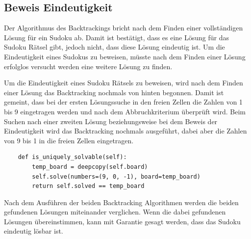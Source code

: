 \subsection{Beweis Eindeutigkeit}
Der Algorithmus des Backtrackings bricht nach dem Finden einer vollständigen Lösung für ein Sudoku ab. Damit ist bestätigt, dass es eine Lösung für das Sudoku Rätsel gibt, jedoch nicht, dass diese Lösung eindeutig ist. Um die Eindeutigkeit eines Sudokus zu beweisen, müsste nach dem Finden einer Lösung erfolglos versucht werden eine weitere Lösung zu finden.

Um die Eindeutigkeit eines Sudoku Rätsels zu beweisen, wird nach dem Finden einer Lösung das Backtracking nochmals von hinten begonnen. Damit ist gemeint, dass bei der ersten Lösungssuche in den freien Zellen die Zahlen von 1 bis 9 eingetragen werden und nach dem Abbruchkriterium überprüft wird. Beim Suchen nach einer zweiten Lösung beziehungsweise bei dem Beweis der Eindeutigkeit wird das Backtracking nochmals ausgeführt, dabei aber die Zahlen von 9 bis 1 in die freien Zellen eingetragen.

\begin{lstlisting}
	def is_uniquely_solvable(self):
		temp_board = deepcopy(self.board)
		self.solve(numbers=(9, 0, -1), board=temp_board)
		return self.solved == temp_board
\end{lstlisting}

Nach dem Ausführen der beiden Backtracking Algorithmen werden die beiden gefundenen Lösungen miteinander verglichen. Wenn die dabei gefundenen Lösungen übereinstimmen, kann mit Garantie gesagt werden, dass das Sudoku eindeutig lösbar ist.

